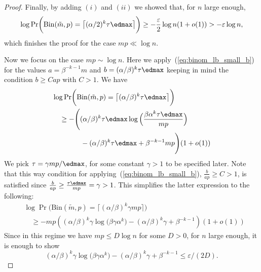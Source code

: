 \begin{proof}
    \noindent
    Finally, by adding \((i)\) and \((ii)\) we showed that, for \(n\) large enough, 
    \begin{equation*}
    \log \Pr\biggl(\mathrm{Bin}(\tilde m, p) = \bigl\lceil (\alpha/2)^k \tau \edmax\bigr\rceil \biggr) \geq - \frac{\varepsilon}{2}\log n (1 + o(1)) > -\varepsilon \log n,
    \end{equation*}
    which finishes the proof for the case \(mp \ll \log n\).

    \noindent
    Now we focus on the case \(mp \sim \log n\). Here we apply~(\ref{eq:binom_lb_small_b}) for the values \(a = {\beta}^{-k-1}m\) and \(b = (\alpha / \beta)^k \tau \edmax\) keeping in mind the condition \(b \geq Cap\) with \(C > 1\). 
    We have
    \begin{equation*}
    \begin{aligned}
         &\log \Pr\biggl(\mathrm{Bin}(\tilde m, p) = \bigl\lceil (\alpha / \beta)^k \tau \edmax\bigr\rceil \biggr) \\
         &\quad \geq - \Bigg((\alpha / \beta)^k \tau \edmax \log \Big(\frac{\beta \alpha^k \tau \edmax}{ mp}\Big) \\ 
         &\qquad \qquad  -(\alpha / \beta)^k \tau \edmax + \beta^{-k-1}mp\Bigg)(1 + o(1)) %
    \end{aligned}
    \end{equation*}
    We pick \(\tau = \gamma mp / \edmax\), for some constant \(\gamma > 1\) to be specified later. Note that this way condition for applying~(\ref{eq:binom_lb_small_b}), \(\frac{b}{ap} \geq C > 1\), is satisfied since \(\frac{b}{ap} \geq \frac{\tau \edmax}{mp} = \gamma > 1\). This simplifies the latter expression to the following:
       \begin{equation*}
    \begin{aligned}
         &\log \Pr\biggl(\mathrm{Bin}(\tilde m, p) = \bigl\lceil (\alpha / \beta)^k \gamma mp\bigr\rceil \biggr) \\
         &\quad \geq - mp\left((\alpha / \beta)^k \gamma \log \bigl(\beta \gamma \alpha^k\bigr) - (\alpha / \beta)^k \gamma + \beta^{-k-1}\right)(1 + o(1)) %
    \end{aligned}
    \end{equation*}
Since in this regime we have \(mp \leq D \log n\) for some \(D > 0\), for \(n\) large enough, it is enough to show 
\begin{equation*}
   (\alpha / \beta)^k \gamma \log \bigl(\beta \gamma \alpha^k\bigr) - (\alpha / \beta)^k \gamma + \beta^{-k-1} \leq \varepsilon / (2D).

\end{equation*}
\end{proof}
